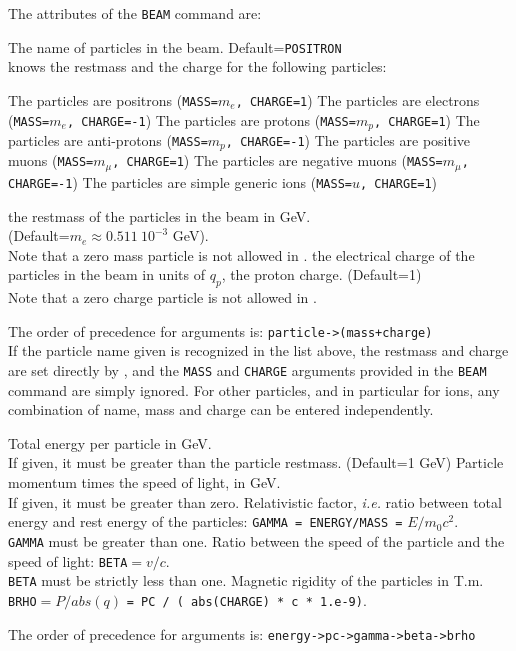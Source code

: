 The attributes of the \texttt{BEAM} command are: 
\begin{madlist}
   The name of particles in the beam. Default=\texttt{POSITRON}\\
  \mad knows the restmass and the charge for the following particles:
  \begin{madlist}
     The particles are positrons (\texttt{MASS=$m_e$, CHARGE=1})
     The particles are electrons (\texttt{MASS=$m_e$, CHARGE=-1}) 
     The particles are protons (\texttt{MASS=$m_p$, CHARGE=1})
     The particles are anti-protons (\texttt{MASS=$m_p$, CHARGE=-1}) 
     The particles are positive muons (\texttt{MASS=$m_{\mu}$, CHARGE=1}) 
     The particles are negative muons (\texttt{MASS=$m_{\mu}$, CHARGE=-1}) 
     The particles are simple generic ions (\texttt{MASS=$u$, CHARGE=1})
  \end{madlist}
   the restmass of the particles in the beam in GeV. \\
  (Default=$m_e \approx 0.511\ 10^{-3}$ GeV).\\
  Note that a zero mass particle is not allowed in \mad.
  \label{beam_charge} the electrical charge of the
  particles in the beam in units of $q_p$, the proton charge. (Default=1) \\
  Note that a zero charge particle is not allowed in \mad.
\end{madlist} 
The order of precedence for arguments is:  \texttt{particle->(mass+charge)}\\ 
If the particle name given is recognized in the list above, the restmass
and charge are set directly by \madx, and the \texttt{MASS} and \texttt{CHARGE} 
arguments provided in the \texttt{BEAM} command are
simply ignored. For other particles, and in particular for ions, any
combination of name, mass and charge can be entered independently.
\\

\begin{madlist}
   \label{beam_energy} Total energy per particle in
  GeV.\\ If given, it must be greater than the particle
  restmass. (Default=1 GeV)
   Particle momentum times the speed of light, in GeV. \\
  If given, it must be greater than zero. 
   Relativistic factor, \textsl{i.e.} ratio between total
  energy and rest energy of the particles: \texttt{GAMMA = ENERGY/MASS
  =} $E / m_0 c^2$. 
  \\ \texttt{GAMMA} must be greater than one. 
   Ratio between the speed of the particle
  and the speed of light: \texttt{BETA}$ = v / c$.\\
  \texttt{BETA} must be strictly less than one.
   Magnetic rigidity of the particles in T.m. \\ 
  \texttt{BRHO}$ = P / abs(q)$ \texttt{= PC / ( abs(CHARGE) * c * 1.e-9)}. 
\end{madlist}  
The order of precedence for arguments is: \texttt{energy->pc->gamma->beta->brho}

